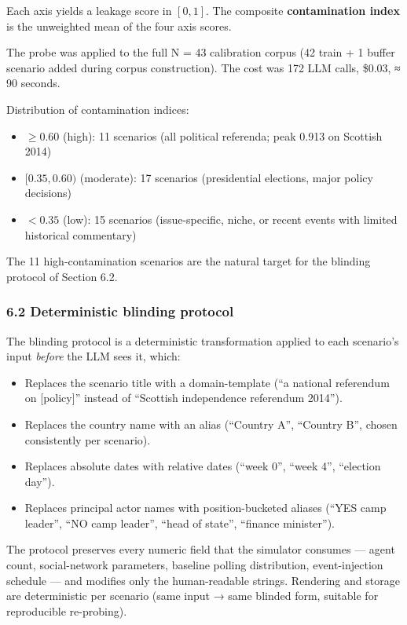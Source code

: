 \documentclass[
]{article}
\providecommand{\tightlist}{%
  \setlength{\itemsep}{0pt}\setlength{\parskip}{0pt}}
\begin{document}
Each axis yields a leakage score in \([0, 1]\). The composite
\textbf{contamination index} is the unweighted mean of the four axis
scores.

The probe was applied to the full N = 43 calibration corpus (42 train +
1 buffer scenario added during corpus construction). The cost was 172
LLM calls, \$0.03, ≈ 90 seconds.

Distribution of contamination indices:

\begin{itemize}
\tightlist
\item
  \(\geq 0.60\) (high): 11 scenarios (all political referenda; peak
  0.913 on Scottish 2014)
\item
  \([0.35, 0.60)\) (moderate): 17 scenarios (presidential elections,
  major policy decisions)
\item
  \(< 0.35\) (low): 15 scenarios (issue-specific, niche, or recent
  events with limited historical commentary)
\end{itemize}

The 11 high-contamination scenarios are the natural target for the
blinding protocol of Section 6.2.

\subsubsection{6.2 Deterministic blinding
protocol}\label{deterministic-blinding-protocol}

The blinding protocol is a deterministic transformation applied to each
scenario's input \emph{before} the LLM sees it, which:

\begin{itemize}
\tightlist
\item
  Replaces the scenario title with a domain-template (``a national
  referendum on {[}policy{]}'' instead of ``Scottish independence
  referendum 2014'').
\item
  Replaces the country name with an alias (``Country A'', ``Country B'',
  chosen consistently per scenario).
\item
  Replaces absolute dates with relative dates (``week 0'', ``week 4'',
  ``election day'').
\item
  Replaces principal actor names with position-bucketed aliases (``YES
  camp leader'', ``NO camp leader'', ``head of state'', ``finance
  minister'').
\end{itemize}

The protocol preserves every numeric field that the simulator consumes
--- agent count, social-network parameters, baseline polling
distribution, event-injection schedule --- and modifies only the
human-readable strings. Rendering and storage are deterministic per
scenario (same input → same blinded form, suitable for reproducible
re-probing).
\end{document}
